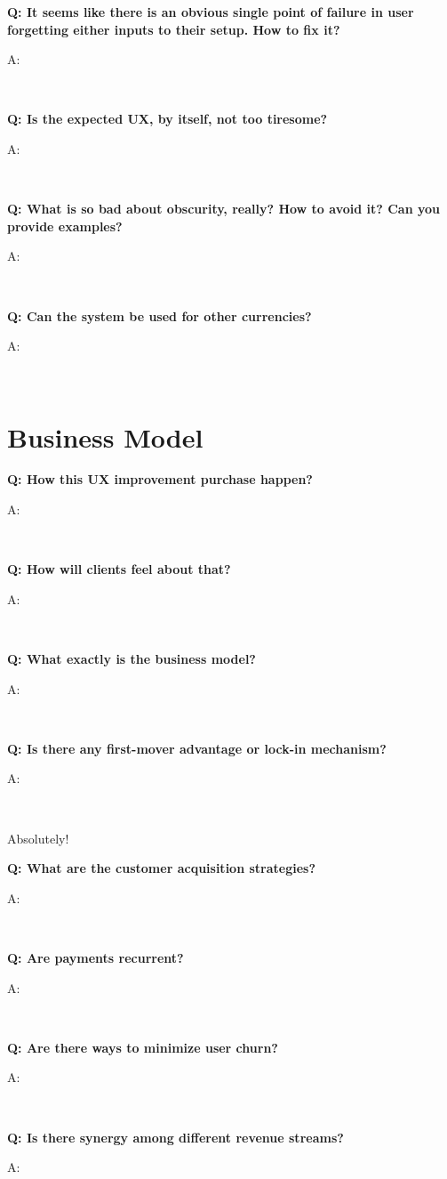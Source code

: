 \documentclass[12pt,a4paper]{article}
\newenvironment{question}[1]{%
  \vspace{0.8em}\noindent\textbf{Q: #1}\par
  \vspace{0.2em}\noindent\begin{itshape}A:\end{itshape}~%
}{\vspace{0.8em}}
\begin{document}
\begin{question}{It seems like there is an obvious single point of failure in user forgetting either inputs to their setup. How to fix it?}
\end{question}

\begin{question}{Is the expected UX, by itself, not too tiresome?}
\end{question}

\begin{question}{What is so bad about obscurity, really? How to avoid it? Can you provide examples?}
\end{question}

\begin{question}{Can the system be used for other currencies?}
\end{question}

\section{Business Model}

\begin{question}{How this UX improvement purchase happen?}
\end{question}

\begin{question}{How will clients feel about that?}
\end{question}

\begin{question}{What exactly is the business model?}
\end{question}

\begin{question}{Is there any first-mover advantage or lock-in mechanism?}
Absolutely!
\end{question}

\begin{question}{What are the customer acquisition strategies?}
\end{question}

\begin{question}{Are payments recurrent?}
\end{question}

\begin{question}{Are there ways to minimize user churn?}
\end{question}

\begin{question}{Is there synergy among different revenue streams?}
\end{question}
\end{document}
